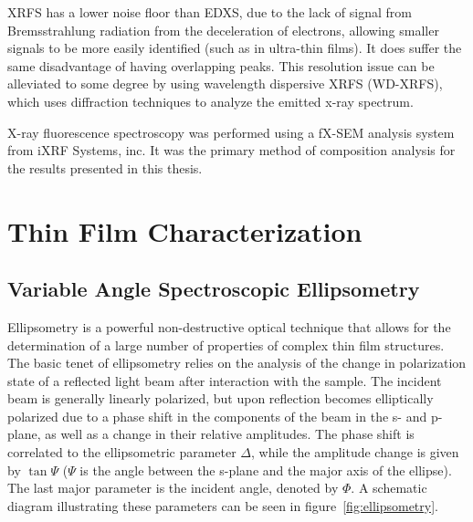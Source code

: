 XRFS has a lower noise floor than EDXS, due to the lack of signal from Bremsstrahlung radiation from the deceleration of electrons, allowing smaller signals to be more easily identified (such as in ultra-thin films). It does suffer the same disadvantage of having overlapping peaks. This resolution issue can be alleviated to some degree by using wavelength dispersive XRFS (WD-XRFS), which uses diffraction techniques to analyze the emitted x-ray spectrum. 

X-ray fluorescence spectroscopy was performed using a fX-SEM analysis system from iXRF Systems, inc.\cite{iXRF-web}  It was the primary method of composition analysis for the results presented in this thesis.


\section{Thin Film Characterization}
\label{sec:Charact-ThinFilm}


	
\subsection{Variable Angle Spectroscopic Ellipsometry}

Ellipsometry is a powerful non-destructive optical technique that allows for the determination of a large number of properties of complex thin film structures. The basic tenet of ellipsometry relies on the analysis of the change in polarization state of a reflected light beam after interaction with the sample. The incident beam is generally linearly polarized, but upon reflection becomes elliptically polarized due to a phase shift in the components of the beam in the s- and p-plane, as well as a change in their relative amplitudes. The phase shift is correlated to the ellipsometric parameter $\Delta$, while the amplitude change is given by $\tan\Psi$ ($\Psi$ is the angle between the s-plane and the major axis of the ellipse). The last major parameter is the incident angle, denoted by $\Phi$. A schematic diagram illustrating these parameters can be seen in figure~\vref{fig:ellipsometry}. 

